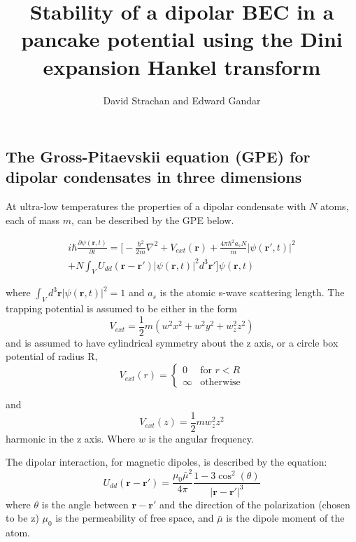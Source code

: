\documentclass[10pt]{article}
\numberwithin{equation}{section}
\begin{document}
\author{ David Strachan and Edward Gandar }
\title{\textbf{Stability of a dipolar BEC in a pancake potential using the Dini expansion Hankel transform}}

\maketitle

\tableofcontents

\pagebreak

\begin{multicols}{2}

\section{The Gross-Pitaevskii equation (GPE) for dipolar condensates in three dimensions}

At ultra-low temperatures the properties of a dipolar condensate with $N$ atoms, each of mass $m$, can be described by the GPE below.

\begin{multline}
i\hbar \frac{\partial \psi(\textbf{r},t)}{\partial t}=\bigg[-\frac{\hbar^2}{2m}\nabla^2 + V_{ext}(\textbf{r}) + \frac{4\pi \hbar^2 a_{s} N}{m}|\psi(\textbf{r}',t)|^2 \\+ N \int_V U_{dd}(\textbf{r}-\textbf{r}')|\psi(\textbf{r},t)|^2d^3\textbf{r}' \bigg]\psi(\textbf{r},t)
\end{multline}

where $\int_V d^3\textbf{r} |\psi(\textbf{r},t)|^2 = 1$ and $a_{s}$ is the atomic s-wave scattering length. The trapping potential is assumed to be either in the form $$V_{ext}=\frac{1}{2}m(w^2 x^2+w^2 y^2+w_{z}^2z^2)$$ and is assumed to have cylindrical symmetry about the z axis, or a circle box potential of radius R,
\begin{equation*}
V_{ext}(r) = 
\begin{cases}
0 & \text{for $r<R$} \\
\infty & \text{otherwise}
\end{cases}
\end{equation*}

and $$V_{ext}(z)=\frac{1}{2}mw_{z}^2z^2$$ harmonic in the z axis. Where $w$ is the angular frequency.

The dipolar interaction, for magnetic dipoles, is described by the equation:
\begin{equation}
U_{dd}(\textbf{r}-\textbf{r}') = \frac{\mu_{0} \bar{\mu}^2}{4\pi} \frac{1-3 \cos^2{(\theta)}}{|\textbf{r}-\textbf{r}'|^3}
\end{equation}
where $\theta$ is the angle between $\textbf{r}-\textbf{r}'$ and the direction of the polarization (chosen to be z) $\mu_{0}$ is the permeability of free space, and $\bar{\mu}$ is the dipole moment of the atom.


\end{multicols}
\end{document}
